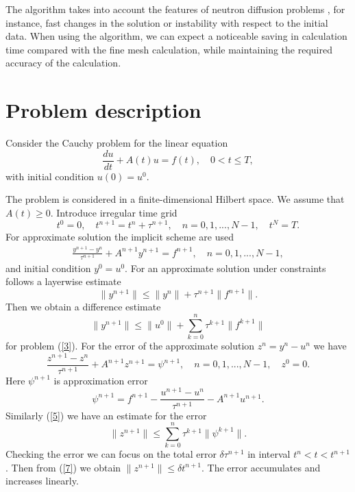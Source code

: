 \documentclass[runningheads]{llncs}
\begin{document}
The algorithm takes into account the features of neutron diffusion problems \cite{Lozenets16}, for instance, fast changes in the solution or instability with respect to the initial data. When using the algorithm, we can expect a noticeable saving in calculation time compared with the fine mesh calculation, while maintaining the required accuracy of the calculation.

\section{Problem description}
Consider the Cauchy problem for the linear equation
\begin{equation}\label{1}
\frac{du}{dt} + A(t)u =f(t), \quad 0 < t \leq T,
\end{equation}
with initial condition $u(0) = u^0$.

The problem is considered in a finite-dimensional Hilbert space.
We assume that $A(t) \geq 0$.
Introduce irregular time grid
\[
t^0 = 0, \quad t^{n+1} = t^n + \tau^{n+1}, \quad 
n = 0, 1, ... , N-1, \quad t^N = T.
\]
For approximate solution the implicit scheme are used
\begin{equation}\label{3}
\begin{split}
  \frac{y^{n+1} - y^{n}}{\tau^{n+1}} + A^{n+1} y^{n+1} = f^{n+1},
  \quad n = 0,1, ..., N-1, 
\end{split}
\end{equation}
and initial condition 
$
y^0 = u^0 .
$
For an approximate solution under constraints follows a layerwise estimate
\[
 \|y^{n+1}\| \leq \|y^{n}\| + \tau^{n+1} \|f^{n+1}\| .
\]
Then we obtain a difference estimate
\begin{equation}\label{5}
 \|y^{n+1}\| \leq \|u^{0}\| + \sum_{k=0}^{n} \tau^{k+1} \|f^{k+1}\|
\end{equation}
for problem (\ref{3}).
For the error of the approximate solution $z^n = y^n - u^n$ we have
\[
  \frac{z^{n+1} - z^{n}}{\tau^{n+1}} + A^{n+1} z^{n+1} = \psi^{n+1},
  \quad n = 0,1, ..., N-1,  \quad
 z^0 = 0.
\]
Here $\psi^{n+1}$ is approximation error
\begin{equation}\label{6}
 \psi^{n+1} = f^{n+1} -
 \frac{u^{n+1} - u^{n}}{\tau^{n+1}} - A^{n+1} u^{n+1} . 
\end{equation}
Similarly (\ref{5}) we have an estimate for the error
\begin{equation}\label{7}
  \|z^{n+1}\| \leq \sum_{k=0}^{n} \tau^{k+1} \|\psi^{k+1}\| .
\end{equation} 
Checking the error we can focus on the total error $\delta\tau^{n+1}$ in interval $t^n < t < t^{n+1}$. Then from (\ref{7}) we obtain
$\|z^{n+1}\| \leq \delta t^{n+1}.$
The error accumulates and increases linearly.
\end{document}
